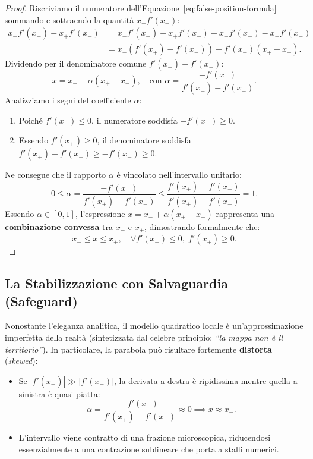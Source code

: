 \begin{proof}
Riscriviamo il numeratore dell'Equazione~\eqref{eq:false-position-formula} sommando e sottraendo la quantit\`a $x_- f'(x_-)$:
\begin{align}
    x_- f'(x_+) - x_+ f'(x_-) &= x_- f'(x_+) - x_+ f'(x_-) + x_- f'(x_-) - x_- f'(x_-) \nonumber \\
    &= x_- \left( f'(x_+) - f'(x_-) \right) - f'(x_-) (x_+ - x_-).
\end{align}
Dividendo per il denominatore comune $f'(x_+) - f'(x_-)$:
\begin{equation}
    x = x_- + \alpha (x_+ - x_-), \quad \text{con } \alpha = \frac{-f'(x_-)}{f'(x_+) - f'(x_-)}.
    \label{eq:convex-combination-alpha}
\end{equation}
Analizziamo i segni del coefficiente $\alpha$:
\begin{enumerate}
    \item Poich\'e $f'(x_-) \le 0$, il numeratore soddisfa $-f'(x_-) \ge 0$.
    \item Essendo $f'(x_+) \ge 0$, il denominatore soddisfa $f'(x_+) - f'(x_-) \ge -f'(x_-) \ge 0$.
\end{enumerate}
Ne consegue che il rapporto $\alpha$ \`e vincolato nell'intervallo unitario:
\begin{equation}
    0 \le \alpha = \frac{-f'(x_-)}{f'(x_+) - f'(x_-)} \le \frac{f'(x_+) - f'(x_-)}{f'(x_+) - f'(x_-)} = 1.
\end{equation}
Essendo $\alpha \in [0, 1]$, l'espressione $x = x_- + \alpha (x_+ - x_-)$ rappresenta una \textbf{combinazione convessa} tra $x_-$ e $x_+$, dimostrando formalmente che:
\begin{equation}
    x_- \le x \le x_+, \quad \forall f'(x_-) \le 0, \; f'(x_+) \ge 0.
\end{equation}
\end{proof}

\subsection{La Stabilizzazione con Salvaguardia (Safeguard)}
\label{subsec:safeguard-technique}
Nonostante l'eleganza analitica, il modello quadratico locale \`e un'approssimazione imperfetta della realt\`a (sintetizzata dal celebre principio: \textit{``la mappa non \`e il territorio''}). In particolare, la parabola pu\`o risultare fortemente \textbf{distorta} (\textit{skewed}):
\begin{itemize}
    \item Se $|f'(x_+)| \gg |f'(x_-)|$, la derivata a destra \`e ripidissima mentre quella a sinistra \`e quasi piatta:
    \begin{equation}
        \alpha = \frac{-f'(x_-)}{f'(x_+) - f'(x_-)} \approx 0 \implies x \approx x_-.
    \end{equation}
    \item L'intervallo viene contratto di una frazione microscopica, riducendosi essenzialmente a una contrazione sublineare che porta a stalli numerici.
\end{itemize}

